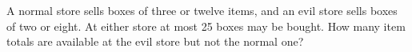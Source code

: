 A normal store sells boxes of three or twelve items, and an evil store sells boxes of two or eight. At either store at most 25 boxes may be bought. How many item totals are available at the evil store but not the normal one?
